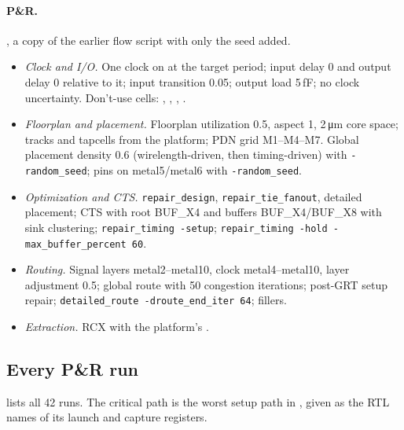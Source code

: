 \paragraph{P\&R.} , a copy of the earlier flow script with only the seed added.
\begin{itemize}
  \item \emph{Clock and I/O.} One clock on  at the target period; input delay 0 and output delay 0 relative to it; input transition 0.05\ns; output load 5\,fF; no clock uncertainty. Don't-use cells: , , , .
  \item \emph{Floorplan and placement.} Floorplan utilization 0.5, aspect 1, 2\,\si{\micro\meter} core space; tracks and tapcells from the platform; PDN grid M1--M4--M7. Global placement density 0.6 (wirelength-driven, then timing-driven) with \texttt{-random\_seed}; pins on metal5/metal6 with \texttt{-random\_seed}.
  \item \emph{Optimization and CTS.} \texttt{repair\_design}, \texttt{repair\_tie\_fanout}, detailed placement; CTS with root BUF\_X4 and buffers BUF\_X4/BUF\_X8 with sink clustering; \texttt{repair\_timing -setup}; \texttt{repair\_timing -hold -max\_buffer\_percent 60}.
  \item \emph{Routing.} Signal layers metal2--metal10, clock metal4--metal10, layer adjustment 0.5; global route with 50 congestion iterations; post-GRT setup repair; \texttt{detailed\_route -droute\_end\_iter 64}; fillers.
  \item \emph{Extraction.} RCX with the platform's .
\end{itemize}

\subsection{Every P\&R run}\label{app:runs}
 lists all 42 runs. The critical path is the worst setup path in , given as the RTL names of its launch and capture registers.

\begin{table}[p]\centering\scriptsize
\caption{All 42 final P\&R runs (utilization 50\,\%, density 0.6), generated by  from . Status: valid (0 DRC, RCX, hold met), DRC $n$ (finished with $n$ violations), TIMEOUT (stopped at 90 min, no result).}\label{tab:pnr-runs}
\resizebox{\textwidth}{!}{}
\end{table}

